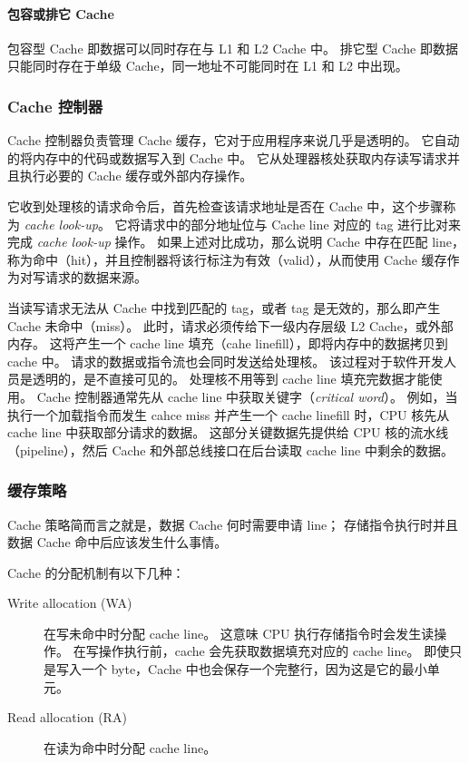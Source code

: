 
\paragraph*{包容或排它 Cache}

包容型 Cache 即数据可以同时存在与 L1 和 L2 Cache 中。
排它型 Cache 即数据只能同时存在于单级 Cache，同一地址不可能同时在 L1 和 L2 中出现。

\subsubsection{Cache 控制器}

Cache 控制器负责管理 Cache 缓存，它对于应用程序来说几乎是透明的。
它自动的将内存中的代码或数据写入到 Cache 中。
它从处理器核处获取内存读写请求并且执行必要的 Cache 缓存或外部内存操作。

它收到处理核的请求命令后，首先检查该请求地址是否在 Cache 中，这个步骤称为 \textit{cache look-up}。
它将请求中的部分地址位与 Cache line 对应的 tag 进行比对来完成 \textit{cache look-up} 操作。
如果上述对比成功，那么说明 Cache 中存在匹配 line，称为命中（hit），并且控制器将该行标注为有效（valid），从而使用 Cache 缓存作为对写请求的数据来源。

当读写请求无法从 Cache 中找到匹配的 tag，或者 tag 是无效的，那么即产生 Cache 未命中（miss）。
此时，请求必须传给下一级内存层级 L2 Cache，或外部内存。
这将产生一个 cache line 填充（cahe linefill），即将内存中的数据拷贝到 cache 中。
请求的数据或指令流也会同时发送给处理核。
该过程对于软件开发人员是透明的，是不直接可见的。
处理核不用等到 cache line 填充完数据才能使用。
Cache 控制器通常先从 cache line 中获取关键字（\textit{critical word}）。
例如，当执行一个加载指令而发生 cahce miss 并产生一个 cache linefill 时，CPU 核先从 cache line 中获取部分请求的数据。
这部分关键数据先提供给 CPU 核的流水线（pipeline），然后 Cache 和外部总线接口在后台读取 cache line 中剩余的数据。

\subsubsection{缓存策略}

Cache 策略简而言之就是，数据 Cache 何时需要申请 line；
存储指令执行时并且数据 Cache 命中后应该发生什么事情。

Cache 的分配机制有以下几种：

\begin{description}
  \item[Write allocation (WA)] 在写未命中时分配 cache line。
    这意味 CPU 执行存储指令时会发生读操作。
    在写操作执行前，cache 会先获取数据填充对应的 cache line。
    即使只是写入一个 byte，Cache 中也会保存一个完整行，因为这是它的最小单元。
  
  \item[Read allocation (RA)] 在读为命中时分配 cache line。
\end{description}


